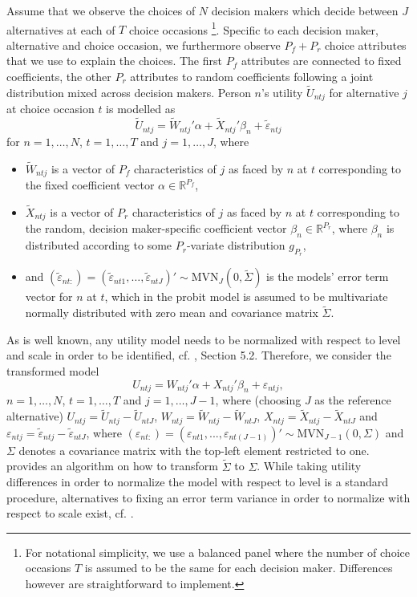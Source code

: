 \documentclass[article]{jss}
\newcommand{\eps}{\varepsilon}
\newcommand{\MVN}[1]{\text{MVN}_{#1}}
\begin{document}
Assume that we observe the choices of $N$ decision makers which decide between $J$ alternatives at each of $T$ choice occasions \footnote{For notational simplicity, we use a balanced panel where the number of choice occasions $T$ is assumed to be the same for each decision maker. Differences however are straightforward to implement.}. Specific to each decision maker, alternative and choice occasion, we furthermore observe $P_f+P_r$ choice attributes that we use to explain the choices. The first $P_f$ attributes are connected to fixed coefficients, the other $P_r$ attributes to random coefficients following a joint  distribution mixed across decision makers. Person $n$'s utility $\tilde{U}_{ntj}$ for alternative $j$ at choice occasion $t$ is modelled as
\begin{equation}
\tilde{U}_{ntj} = \tilde{W}_{ntj}'\alpha + \tilde{X}_{ntj}'\beta_n + \tilde{\eps}_{ntj}
\end{equation}
for $n=1,\dots,N$, $t=1,\dots,T$ and $j=1,\dots,J$, where
\begin{itemize}
	\item $\tilde{W}_{ntj}$ is a vector of $P_f$ characteristics of $j$ as faced by  $n$ at $t$ corresponding to the fixed coefficient vector $\alpha \in {\mathbb R}^{P_f}$,
	\item $\tilde{X}_{ntj}$ is a vector of $P_r$ characteristics of $j$ as faced by  $n$ at $t$ corresponding to the random, decision maker-specific coefficient vector $\beta_n \in {\mathbb R}^{P_r}$, where $\beta_n$ is distributed according to some $P_r$-variate distribution $g_{P_r}$,
	\item and $(\tilde{\eps}_{nt:}) = (\tilde{\eps}_{nt1},\dots,\tilde{\eps}_{ntJ})' \sim \MVN{J} (0,\tilde{\Sigma})$ is the models' error term vector for $n$ at $t$, which in the probit model is assumed to be multivariate normally distributed with zero mean and covariance matrix $\tilde{\Sigma}$.
\end{itemize}
As is well known, any utility model needs to be normalized with respect to level and scale in order to be identified, cf. \cite{Train:09}, Section 5.2. Therefore, we consider the transformed model
\begin{equation}
\label{eq:model}
U_{ntj} = W_{ntj}'\alpha + X_{ntj}'\beta_n + \eps_{ntj},
\end{equation}
$n=1,\dots,N$, $t=1,\dots,T$ and $j=1,\dots,J-1$, where (choosing $J$ as the reference alternative) $U_{ntj}=\tilde{U}_{ntj} - \tilde{U}_{ntJ}$, $W_{ntj}=\tilde{W}_{ntj}-\tilde{W}_{ntJ}$, $X_{ntj}=\tilde{X}_{ntj}-\tilde{X}_{ntJ}$ and $\eps_{ntj}=\tilde{\eps}_{ntj}-\tilde{\eps}_{ntJ}$, where $(\eps_{nt:}) = (\eps_{nt1},...,\eps_{nt(J-1)})'  \sim \MVN{J-1} (0,\Sigma)$ and $\Sigma$ denotes a covariance matrix with the top-left element restricted to one. \cite{Train:09} provides an algorithm on how to transform $\tilde{\Sigma}$ to $\Sigma$. While taking utility differences in order to normalize the model with respect to level is a standard procedure, alternatives to fixing an error term variance in order to normalize with respect to scale exist, cf. \cite{Mori:14}.
\end{document}
